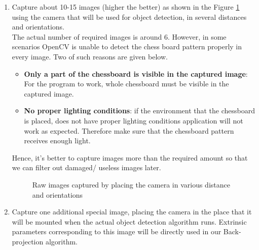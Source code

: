 \documentclass[a4paper,12pt]{report}%
\begin{document}
\begin{appendices}
\begin{enumerate}
		\item Capture about 10-15 images (higher the better) as shown in the Figure \ref{fig:rawimages} using the camera that will be used for object detection, in several distances and orientations.\\
		
		The actual number of required images is around 6. However, in some scenarios OpenCV is unable to detect the chess board pattern properly in every image. Two of such reasons are given below.
		
		\begin{itemize}
			\item\textbf{Only a part of the chessboard is visible in the captured image}: For the program to work, whole chessboard must be visible in the captured image.
			
			\item \textbf{No proper lighting conditions}: if the environment that the  chessboard is placed, does not have proper lighting conditions application will not work as expected. Therefore make sure that the chessboard pattern receives enough light.
			
		\end{itemize}
		Hence, it's better to capture images more than the required amount so that we can filter out damaged/ useless images later. 
		
		\begin{figure}[h]
			\centering
			\caption{Raw images captured by placing the camera in various distance and orientations}
			\label{fig:rawimages}
		\end{figure}
		
		\item Capture one additional special image, placing the camera in the place that it will be mounted when the actual object detection algorithm runs. Extrinsic parameters\cite{hartley_zisserman_2004} corresponding to this image will be directly used in our Back-projection algorithm.\\
		

\end{enumerate}
\end{appendices}
\end{document}
